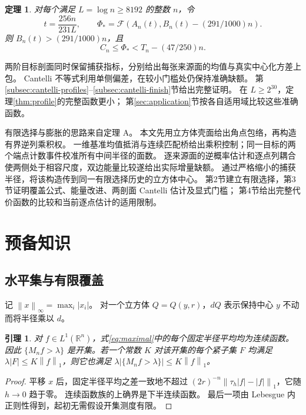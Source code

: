 \documentclass[UTF8,a4paper,11pt,fontset=fandol]{ctexart}
\newtheorem{theorem}{定理}
\newtheorem{lemma}{引理}[section]
\theoremstyle{remark}
\newcommand{\R}{\mathbb R}
\newcommand{\norm}[1]{\left\lVert#1\right\rVert}
\newcommand{\Fcal}{\mathcal F}
\begin{document}
\begin{theorem}\label{thm:cantelli}
对每个满足 $L=\log n\ge8192$ 的整数 $n$，令
\[
 t=\frac{256n}{231L},\qquad
 \Phi_*=\Fcal(A_n(t),B_n(t)-(291/1000)n).
\]
则 $B_n(t)>(291/1000)n$，且
\[
 C_n\le\Phi_*<T_n-(47/250)n.
\]
\end{theorem}
两阶目标剖面同时保留捕获指标，分别给出每张来源面的均值与真实中心化方差上包。
Cantelli 不等式利用单侧偏差，在较小门槛处仍保持准确缺额。
第\ref{subsec:cantelli-profiles}--\ref{subsec:cantelli-finish}节给出完整证明。
在 $L\ge2^{30}$，定理\ref{thm:profile}的完整函数更小；
第\ref{sec:application}节按各自适用域比较这些准确函数。

有限选择与膨胀的思路来自定理 A。
本文先用立方体壳面给出角点包络，再构造有界逆列乘积权。
一维基准均值抵消与连续匹配桥给出乘积控制；同一目标的两个端点计数事件校准所有中间半径的面数。
逐来源面的逆概率估计和逐点列耦合使两侧处于相容尺度，双边能量比较遂给出实际增量缺额。
通过严格缩小的捕获半径，将该构造传到同一有限选择历史的立方体中心。
第2节建立有限选择，第3节证明覆盖公式、能量改进、两剖面 Cantelli 估计及显式门槛；
第4节给出完整代价函数的比较和当前逐点估计的适用限制。
\section{预备知识}
\subsection{水平集与有限覆盖}
记 $\norm{x}_\infty=\max_i|x_i|$。
对一个立方体 $Q=Q(y,r)$，$dQ$ 表示保持中心 $y$ 不动而将半径乘以 $d$。

\begin{lemma}\label{lem:open}
对 $f\in L^1(\R^n)$，式\eqref{eq:maximal}中的每个固定半径平均均为连续函数。
因此 $\{M_nf>\lambda\}$ 是开集。若一个常数 $K$ 对该开集的每个紧子集 $F$
均满足 $\lambda |F|\le K\norm f_1$，则它也满足
$\lambda|\{M_nf>\lambda\}|\le K\norm f_1$。
\end{lemma}
\begin{proof}
平移 $x$ 后，固定半径平均之差一致地不超过
$(2r)^{-n}\norm{\tau_h|f|-|f|}_1$，它随 $h\to0$ 趋于零。
连续函数族的上确界是下半连续函数。
最后一项由 Lebesgue 内正则性得到，起初无需假设开集测度有限。
\end{proof}
\end{document}
